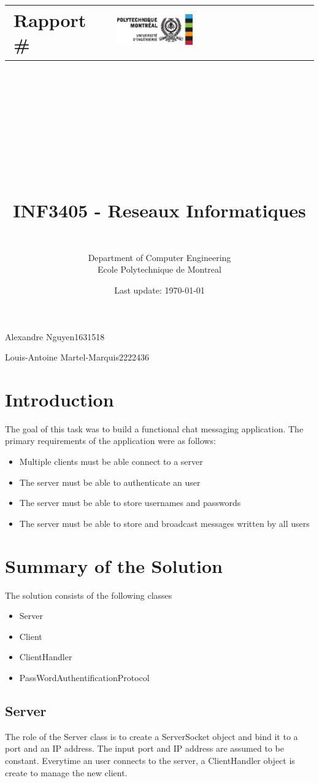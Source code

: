 \documentclass[11pt,letterpaper]{article}
\title{\vspace{-2.5cm} \noindent\makebox[\linewidth]{\color{rouge_poly}{\rule{\textwidth}{1.5pt}}}
		\begin{center}
		\begin{tabular}{m{6.5cm}m{6cm}}
		\textbf{ \huge Rapport \#\reportnumber}  & \includegraphics[width=0.4\textwidth]{logo_polytechnique.eps}
		\end{tabular}
		\end{center}
		\vspace{-0.25cm}
		\noindent\makebox[\linewidth]{\color{rouge_poly}{\rule{\textwidth}{1.5pt}}}
		\\ \  \\
		\Huge \firsttitle \\ \secondtitle  
		\\ \ \\
		\LARGE INF3405 -  Reseaux Informatiques
		}
\author{\session \\ Department of Computer Engineering \\ Ecole Polytechnique de Montreal}
\date{Last update: \today}
\newcommand{\firstauthor}{Alexandre Nguyen}
\newcommand{\firstregistrationnumber}{1631518}
\newcommand{\secondauthor}{Louis-Antoine Martel-Marquis}
\newcommand{\secondregistrationnumber}{2222436}
\begin{document}
\maketitle
\noindent\makebox[\linewidth]{\color{rouge_poly}{\rule{\textwidth}{1.5pt}}} 

\noindent \LARGE \firstauthor  \hfill \firstregistrationnumber

\noindent \LARGE \secondauthor \hfill \secondregistrationnumber

\noindent\makebox[\linewidth]{\color{rouge_poly}{\rule{\textwidth}{1.5pt}}}


\newpage
\normalsize

\section{Introduction}

The goal of this task was to build  a functional chat messaging application. The primary requirements of the application were as follows:
\begin{itemize}
  \item Multiple clients must be able connect to a server
  \item The server must be able to authenticate an user
  \item The server must be able to store usernames and passwords
   \item The server must be able to store and broadcast messages written by all users
\end{itemize}

\section{Summary of the Solution}


The solution consists of the following classes
\begin{itemize}
  \item Server
  \item Client
  \item ClientHandler
   \item PassWordAuthentificationProtocol
\end{itemize}

\subsection{Server}
The role of the Server class is to create a ServerSocket object and bind it to a port and an IP address. The input port and IP address are assumed to be constant. Everytime an user connects to the server, a ClientHandler object is create to manage the new client.
\end{document}
